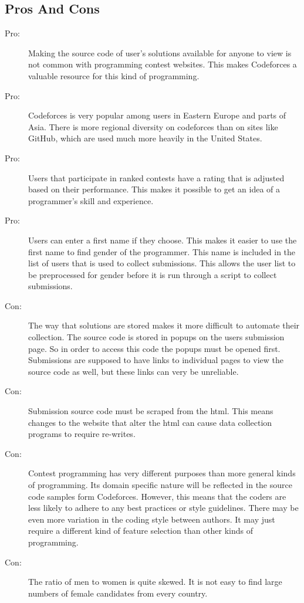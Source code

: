 \documentclass[12pt]{article}
\begin{document}
\subsection{Pros And Cons}
\begin{description}
    \item [Pro:] Making the source code of user's solutions available for anyone to view is not common with programming contest websites. This makes Codeforces a valuable resource for this kind of programming.
    
    \item [Pro:] Codeforces is very popular among users in Eastern Europe and parts of Asia. There is more regional diversity on codeforces than on sites like GitHub, which are used much more heavily in the United States.
    
    \item [Pro:] Users that participate in ranked contests have a rating that is adjusted based on their performance. This makes it possible to get an idea of a programmer's skill and experience.
    
    \item [Pro:] Users can enter a first name if they choose. This makes it easier to use the first name to find gender of the programmer. This name is included in the list of users that is used to collect submissions. This allows the user list to be preprocessed for gender before it is run through a script to collect submissions.

    \item [Con:] The way that solutions are stored makes it more difficult to automate their collection. The source code is stored in popups on the users submission page. So in order to access this code the popups must be opened first. Submissions are supposed to have links to individual pages to view the source code as well, but these links can very be unreliable.

    \item [Con:] Submission source code must be scraped from the html. This means changes to the website that alter the html can cause data collection programs to require re-writes.

    \item [Con:] Contest programming has very different purposes than more general kinds of programming. Its domain specific nature will be reflected in the source code samples form Codeforces. However, this means that the coders are less likely to adhere to any best practices or style guidelines. There may be even more variation in the coding style between authors. It may just require a different kind of feature selection than other kinds of programming.

    \item [Con:] The ratio of men to women is quite skewed. It is not easy to find large numbers of female candidates from every country.
\end{description}
\end{document}
